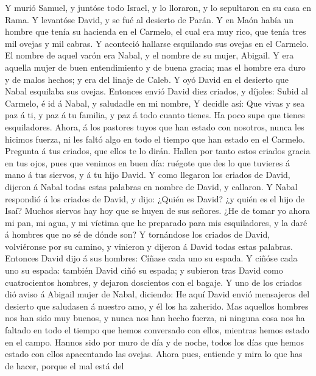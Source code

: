  Y murió Samuel, y juntóse todo Israel, y lo lloraron, y
lo sepultaron en su casa en Rama. Y levantóse David, y se fué al
desierto de Parán.  Y en Maón había un hombre que tenía su
hacienda en el Carmelo, el cual era muy rico, que tenía tres mil ovejas
y mil cabras. Y aconteció hallarse esquilando sus ovejas en el Carmelo.
 El nombre de aquel varón era Nabal, y el nombre de su
mujer, Abigail. Y era aquella mujer de buen entendimiento y de buena
gracia; mas el hombre era duro y de malos hechos; y era del linaje de
Caleb.  Y oyó David en el desierto que Nabal esquilaba sus
ovejas.  Entonces envió David diez criados, y díjoles:
Subid al Carmelo, é id á Nabal, y saludadle en mi nombre, 
Y decidle así: Que vivas y sea paz á ti, y paz á tu familia, y paz á
todo cuanto tienes.  Ha poco supe que tienes esquiladores.
Ahora, á los pastores tuyos que han estado con nosotros, nunca les
hicimos fuerza, ni les faltó algo en todo el tiempo que han estado en el
Carmelo.  Pregunta á tus criados, que ellos te lo dirán.
Hallen por tanto estos criados gracia en tus ojos, pues que venimos en
buen día: ruégote que des lo que tuvieres á mano á tus siervos, y á tu
hijo David.  Y como llegaron los criados de David, dijeron
á Nabal todas estas palabras en nombre de David, y callaron.
 Y Nabal respondió á los criados de David, y dijo: ¿Quién
es David? ¿y quién es el hijo de Isaí? Muchos siervos hay hoy que se
huyen de sus señores.  ¿He de tomar yo ahora mi pan, mi
agua, y mi víctima que he preparado para mis esquiladores, y la daré á
hombres que no sé de dónde son?  Y tornándose los criados
de David, volviéronse por su camino, y vinieron y dijeron á David todas
estas palabras.  Entonces David dijo á sus hombres:
Cíñase cada uno su espada. Y ciñóse cada uno su espada: también David
ciñó su espada; y subieron tras David como cuatrocientos hombres, y
dejaron doscientos con el bagaje.  Y uno de los criados
dió aviso á Abigail mujer de Nabal, diciendo: He aquí David envió
mensajeros del desierto que saludasen á nuestro amo, y él los ha
zaherido.  Mas aquellos hombres nos han sido muy buenos,
y nunca nos han hecho fuerza, ni ninguna cosa nos ha faltado en todo el
tiempo que hemos conversado con ellos, mientras hemos estado en el
campo.  Hannos sido por muro de día y de noche, todos los
días que hemos estado con ellos apacentando las ovejas. 
Ahora pues, entiende y mira lo que has de hacer, porque el mal está del
